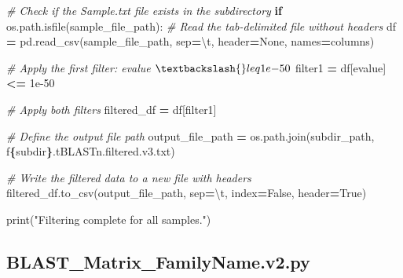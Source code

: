 \documentclass[
]{book}
\newenvironment{Shaded}{\begin{snugshade}}{\end{snugshade}}
\newcommand{\BuiltInTok}[1]{#1}
\newcommand{\CharTok}[1]{\textcolor[rgb]{0.31,0.60,0.02}{#1}}
\newcommand{\CommentTok}[1]{\textcolor[rgb]{0.56,0.35,0.01}{\textit{#1}}}
\newcommand{\ControlFlowTok}[1]{\textcolor[rgb]{0.13,0.29,0.53}{\textbf{#1}}}
\newcommand{\FloatTok}[1]{\textcolor[rgb]{0.00,0.00,0.81}{#1}}
\newcommand{\NormalTok}[1]{#1}
\newcommand{\OperatorTok}[1]{\textcolor[rgb]{0.81,0.36,0.00}{\textbf{#1}}}
\newcommand{\SpecialCharTok}[1]{\textcolor[rgb]{0.81,0.36,0.00}{\textbf{#1}}}
\newcommand{\SpecialStringTok}[1]{\textcolor[rgb]{0.31,0.60,0.02}{#1}}
\newcommand{\StringTok}[1]{\textcolor[rgb]{0.31,0.60,0.02}{#1}}
\newcommand{\VariableTok}[1]{\textcolor[rgb]{0.00,0.00,0.00}{#1}}
\begin{document}
\begin{Shaded}
\begin{Highlighting}[]
        \CommentTok{\# Check if the Sample.txt file exists in the subdirectory}
        \ControlFlowTok{if}\NormalTok{ os.path.isfile(sample\_file\_path):}
            \CommentTok{\# Read the tab{-}delimited file without headers}
\NormalTok{            df }\OperatorTok{=}\NormalTok{ pd.read\_csv(sample\_file\_path, sep}\OperatorTok{=}\StringTok{\textquotesingle{}}\CharTok{\textbackslash{}t}\StringTok{\textquotesingle{}}\NormalTok{, header}\OperatorTok{=}\VariableTok{None}\NormalTok{, names}\OperatorTok{=}\NormalTok{columns)}
            
            \CommentTok{\# Apply the first filter: evalue $\textbackslash{}leq 1e{-}50$}
\NormalTok{            filter1 }\OperatorTok{=}\NormalTok{ df[}\StringTok{\textquotesingle{}evalue\textquotesingle{}}\NormalTok{] }\OperatorTok{\textless{}=} \FloatTok{1e{-}50}
            
            \CommentTok{\# Apply both filters}
\NormalTok{            filtered\_df }\OperatorTok{=}\NormalTok{ df[filter1]}
            
            \CommentTok{\# Define the output file path}
\NormalTok{            output\_file\_path }\OperatorTok{=}\NormalTok{ os.path.join(subdir\_path, }\SpecialStringTok{f\textquotesingle{}}\SpecialCharTok{\{}\NormalTok{subdir}\SpecialCharTok{\}}\SpecialStringTok{.tBLASTn.filtered.v3.txt\textquotesingle{}}\NormalTok{)}
            
            \CommentTok{\# Write the filtered data to a new file with headers}
\NormalTok{            filtered\_df.to\_csv(output\_file\_path, sep}\OperatorTok{=}\StringTok{\textquotesingle{}}\CharTok{\textbackslash{}t}\StringTok{\textquotesingle{}}\NormalTok{, index}\OperatorTok{=}\VariableTok{False}\NormalTok{, header}\OperatorTok{=}\VariableTok{True}\NormalTok{)}

\BuiltInTok{print}\NormalTok{(}\StringTok{"Filtering complete for all samples."}\NormalTok{)}
\end{Highlighting}
\end{Shaded}

\subsection{BLAST\_Matrix\_FamilyName.v2.py}\label{mxfn2-script}
\end{document}
